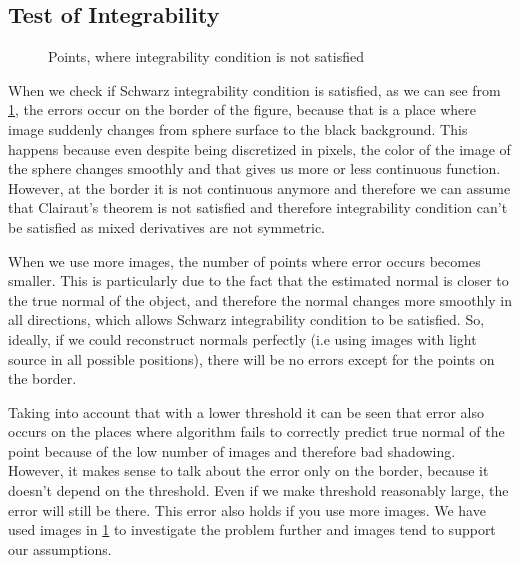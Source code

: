 \documentclass{article}
\begin{document}
\subsection{Test of Integrability}
  \begin{figure}[h]
    \centering
    \qquad
    \qquad
    \qquad
    \caption{Points, where integrability condition is not satisfied}
    \label{fig:second_deriv}
    
\end{figure}
 When we check if Schwarz integrability condition is satisfied, as we can see from \cref{fig:second_deriv}, the errors occur on the border of the figure, because that is a place where image suddenly changes from sphere surface to the black background. This happens because even despite being discretized in pixels, the color of the image of the sphere changes smoothly and that gives us more or less continuous function. However, at the border it is not continuous anymore and therefore we can assume that Clairaut's theorem is not satisfied and therefore integrability condition can't be satisfied as mixed derivatives are not symmetric. 
 
 When we use more images, the number of points where error occurs becomes smaller. This is particularly due to the fact that the estimated normal is closer to the true normal of the object, and therefore the normal changes more smoothly in all directions, which allows Schwarz integrability condition to be satisfied. So, ideally, if we could reconstruct normals perfectly (i.e using images with light source in all possible positions), there will be no errors except for the points on the border.
 
 Taking into account that with a lower threshold it can be seen that error also occurs on the places where algorithm fails to correctly predict true normal of the point because of the low number of images and therefore bad shadowing. However, it makes sense to talk about the error only on the border, because it doesn't depend on the threshold. Even if we make threshold reasonably large, the error will still be there. This error also holds if you use more images. We have used images in \cref{fig:second_deriv} to investigate the problem further and images tend to support our assumptions.
\end{document}
